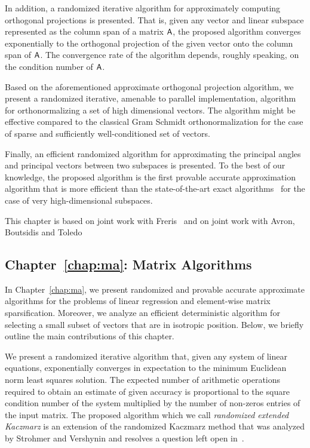 %
In addition, a randomized iterative algorithm for approximately computing orthogonal projections is presented. That is, given any vector and linear subspace represented as the column span of a matrix ${\mathsf{A} }$, the proposed algorithm converges exponentially to the orthogonal projection of the given vector onto the column span of ${\mathsf{A} }$. The convergence rate of the algorithm depends, roughly speaking, on the condition number of ${\mathsf{A} }$.
%

%
Based on the aforementioned approximate orthogonal projection algorithm, we present a randomized iterative, amenable to parallel implementation, algorithm for orthonormalizing a set of high dimensional vectors. The algorithm might be effective compared to the classical Gram Schmidt orthonormalization for the case of sparse and sufficiently well-conditioned set of vectors.
%

%
Finally, an efficient randomized algorithm for approximating the principal angles and principal vectors between two subspaces is presented. To the best of our knowledge, the proposed algorithm is the first provable accurate approximation algorithm that is more efficient than the state-of-the-art exact algorithms~\cite{GZ95} for the case of very high-dimensional subspaces.
\begin{center}
This chapter is based on joint work with Freris~\cite{REK} and on joint work with Avron, Boutsidis and Toledo~\cite{approxCCA}
\end{center}
%
%
\subsection*{Chapter~\ref{chap:ma}: Matrix Algorithms}
%
In Chapter~\ref{chap:ma}, we present randomized and provable accurate approximate algorithms for the problems of linear regression and element-wise matrix sparsification. Moreover, we analyze an efficient deterministic algorithm for selecting a small subset of vectors that are in isotropic position. Below, we briefly outline the main contributions of this chapter.
%

%
We present a randomized iterative algorithm that, given any system of linear equations, exponentially converges in expectation to the minimum Euclidean norm least squares solution. The expected number of arithmetic operations required to obtain an estimate of given accuracy is proportional to the square condition number of the system multiplied by the number of non-zeros entries of the input matrix. The proposed algorithm which we call \emph{randomized extended Kaczmarz} is an extension of the randomized Kaczmarz method that was analyzed by Strohmer and Vershynin and resolves a question left open in~\cite{SV06,RK}.
%


